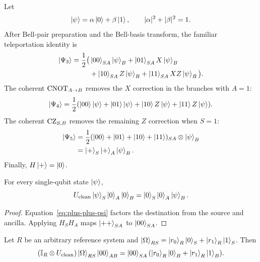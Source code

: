Let
\begin{equation}
  \ket{\psi}=\alpha\ket{0}+\beta\ket{1},
  \qquad |\alpha|^2+|\beta|^2=1.
\end{equation}
After Bell-pair preparation and the Bell-basis transform, the familiar
teleportation identity is
\begin{equation}
\begin{aligned}
  \ket{\Psi_3}=\frac{1}{2}\big(&
  \ket{00}_{SA}\ket{\psi}_B
  +\ket{01}_{SA}X\ket{\psi}_B\\
  &+\ket{10}_{SA}Z\ket{\psi}_B
  +\ket{11}_{SA}XZ\ket{\psi}_B\big).
  \label{eq:teleport-branches}
\end{aligned}
\end{equation}
The coherent $\operatorname{CNOT}_{A\rightarrow B}$ removes the $X$ correction in the
branches with $A=1$:
\begin{equation}
  \ket{\Psi_4}=\frac{1}{2}
  (\ket{00}\ket{\psi}+\ket{01}\ket{\psi}
  +\ket{10}Z\ket{\psi}+\ket{11}Z\ket{\psi}).
\end{equation}
The coherent $\operatorname{CZ}_{S,B}$ removes the remaining $Z$ correction when $S=1$:
\begin{equation}
\begin{aligned}
  \ket{\Psi_5}
  &=\frac{1}{2}(\ket{00}+\ket{01}+\ket{10}+\ket{11})_{SA}
    \otimes\ket{\psi}_B\\
  &=\ket{+}_S\ket{+}_A\ket{\psi}_B.
  \label{eq:plus-plus-psi}
\end{aligned}
\end{equation}
Finally, $H\ket{+}=\ket{0}$.

\begin{theorem}
For every single-qubit state $\ket{\psi}$,
\begin{equation}
  U_{\mathrm{clean}}\ket{\psi}_{S}\ket{0}_{A}\ket{0}_{B}
  =\ket{0}_{S}\ket{0}_{A}\ket{\psi}_{B}.
  \label{eq:cleanup-theorem}
\end{equation}
\end{theorem}

\begin{proof}
Equation~\eqref{eq:plus-plus-psi} factors the destination from the source and
ancilla. Applying $H_S H_A$ maps $\ket{++}_{SA}$ to $\ket{00}_{SA}$.
\end{proof}

\begin{corollary}\label{cor:reference-preservation}
Let $R$ be an arbitrary reference system and
$\ket{\Omega}_{RS}=\ket{r_0}_R\ket{0}_S+\ket{r_1}_R\ket{1}_S$.
Then
\begin{equation}
  (\mathbb{I}_R\otimes U_{\mathrm{clean}})
  \ket{\Omega}_{RS}\ket{00}_{AB}
  =\ket{00}_{SA}
   (\ket{r_0}_R\ket{0}_B+\ket{r_1}_R\ket{1}_B).
\end{equation}
\end{corollary}

